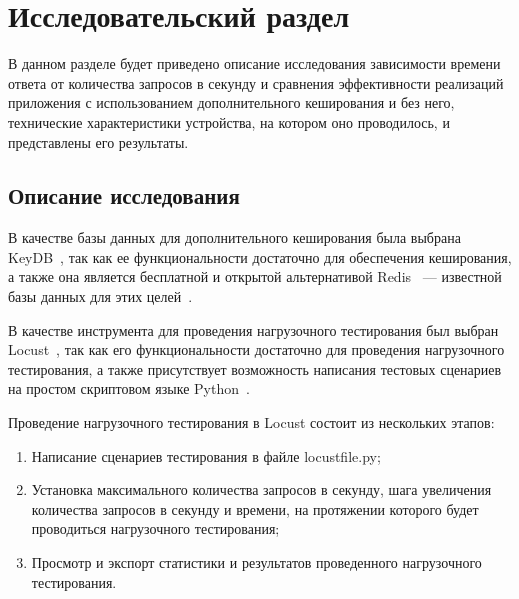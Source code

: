 \section{Исследовательский раздел}

В данном разделе будет приведено описание исследования зависимости времени ответа от количества запросов в секунду и сравнения эффективности реализаций приложения с использованием дополнительного кеширования и без него, технические характеристики устройства, на котором оно проводилось, и представлены его результаты.



\subsection{Описание исследования}

В качестве базы данных для дополнительного кеширования была выбрана KeyDB~\cite{keydb}, так как ее функциональности достаточно для обеспечения кеширования, а также она является бесплатной и открытой альтернативой Redis~\cite{redis} --- известной базы данных для этих целей~\cite{redis-jobs}.

В качестве инструмента для проведения нагрузочного тестирования был выбран Locust~\cite{locust}, так как его функциональности достаточно для проведения нагрузочного тестирования, а также присутствует возможность написания тестовых сценариев на простом скриптовом языке Python~\cite{python}.

Проведение нагрузочного тестирования в Locust состоит из нескольких этапов:
\begin{enumerate}
    \item Написание сценариев тестирования в файле locustfile.py;
    \item Установка максимального количества запросов в секунду, шага увеличения количества запросов в секунду и времени, на протяжении которого будет проводиться нагрузочного тестирования;
    \item Просмотр и экспорт статистики и результатов проведенного нагрузочного тестирования.
\end{enumerate}

